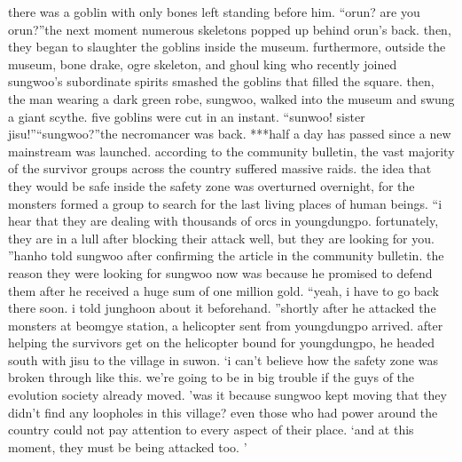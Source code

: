 there was a goblin with only bones left standing before him.
“orun? are you orun?”the next moment numerous skeletons popped up behind orun’s back.
 then, they began to slaughter the goblins inside the museum.
furthermore, outside the museum, bone drake, ogre skeleton, and ghoul king who recently joined sungwoo’s subordinate spirits smashed the goblins that filled the square.
then, the man wearing a dark green robe, sungwoo, walked into the museum and swung a giant scythe.
 five goblins were cut in an instant.
“sunwoo! sister jisu!”“sungwoo?”the necromancer was back.
***half a day has passed since a new mainstream was launched.
 according to the community bulletin, the vast majority of the survivor groups across the country suffered massive raids.
the idea that they would be safe inside the safety zone was overturned overnight, for the monsters formed a group to search for the last living places of human beings.
“i hear that they are dealing with thousands of orcs in youngdungpo.
 fortunately, they are in a lull after blocking their attack well, but they are looking for you.
”hanho told sungwoo after confirming the article in the community bulletin.
 the reason they were looking for sungwoo now was because he promised to defend them after he received a huge sum of one million gold.
“yeah, i have to go back there soon.
 i told junghoon about it beforehand.
”shortly after he attacked the monsters at beomgye station, a helicopter sent from youngdungpo arrived.
 after helping the survivors get on the helicopter bound for youngdungpo, he headed south with jisu to the village in suwon.
‘i can’t believe how the safety zone was broken through like this.
 we’re going to be in big trouble if the guys of the evolution society already moved.
’was it because sungwoo kept moving that they didn’t find any loopholes in this village? even those who had power around the country could not pay attention to every aspect of their place.
‘and at this moment, they must be being attacked too.
’

 